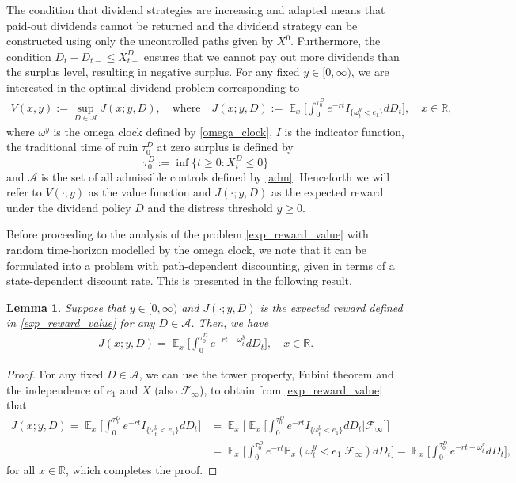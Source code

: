 \documentclass[11pt]{article} %
\newtheorem{lemma}[theorem]{Lemma}
\def\R{\mathbb{R}}
\def\Pr{\mathbb{P}}
\DeclareMathOperator{\E}{\mathbb E}
\numberwithin{komcounter}{section}
\numberwithin{equation}{section}
\numberwithin{theorem}{section}
\begin{document}
The condition that dividend strategies are increasing and adapted means that paid-out dividends cannot be returned and the dividend strategy can be constructed using only the uncontrolled paths given by $X^0$. 
Furthermore, the condition $D_{t}-D_{t-} \leq X_{t-}^D$ ensures that we cannot pay out more dividends than the surplus level, resulting in negative surplus.
For any fixed $y \in [0,\infty)$, we are interested in the optimal dividend problem corresponding to 
\begin{align}\label{exp_reward_value}
V(x,y) := \sup_{D\in\mathcal{A}} J(x;y,D), 
\quad \text{where} \quad 
J(x;y,D) := \E_x\bigg[\int_0^{\tau^D_0}e^{-rt}I_{\{\omega^y_t<e_1\}}dD_t\bigg], 
\quad x \in \R,
\end{align}
where $\omega^y$ is the omega clock defined by \eqref{omega_clock}, $I$ is the indicator function, the traditional time of ruin $\tau^D_0$ at zero surplus is defined by 
$$
\tau^D_0 := \inf\big\{t\geq 0 : X^D_t\leq 0 \big\}
$$ 
and $\mathcal{A}$ is the set of all admissible controls defined by \eqref{adm}.
Henceforth we will refer to $V(\cdot;y)$ as the value function and $J(\cdot;y,D)$ as the expected reward under the dividend policy $D$ and the distress threshold $y \geq 0$. 

Before proceeding to the analysis of the problem \eqref{exp_reward_value} with random time-horizon modelled by the omega clock, we note that it can be formulated into a problem with path-dependent discounting, given in terms of a state-dependent discount rate. 
This is presented in the following result. 

\begin{lemma}
\label{discount_chance_lemma}
Suppose that $y \in [0,\infty)$ and $J(\cdot;y,D)$ is the expected reward defined in \eqref{exp_reward_value} for any $D \in \mathcal{A}$. 
Then, we have 
\begin{align}
\label{expected_reward_discount}
J(x;y,D)=\E_x\bigg[\int_0^{\tau^D_0}e^{-rt-\omega^y_t}dD_t\bigg], 
\quad x \in \R.
\end{align}
\end{lemma}

\begin{proof}
For any fixed $D \in \mathcal{A}$, we can use the tower property, Fubini theorem and the independence of $e_1$ and $X$ (also $\mathcal{F}_{\infty}$), to obtain from \eqref{exp_reward_value} that
\begin{align*}
J(x;y,D) 
= \E_x\bigg[ \int_0^{\tau^D_0}e^{-rt}I_{\{\omega^y_t<e_1\}}dD_t \bigg] 
&= \E_x\bigg[ \E_x\bigg[ \int_0^{\tau^D_0} e^{-rt} I_{\{\omega^y_t<e_1\}} dD_t \bigg| \mathcal{F}_{\infty} \bigg] \bigg] \\
&= \E_x\bigg[ \int_0^{\tau^D_0} e^{-rt} \Pr_x \left( \omega^y_t<e_1 | \mathcal{F}_{\infty} \right) dD_t \bigg] 
= \E_x\bigg[ \int_0^{\tau^D_0} e^{-rt-\omega^y_t} dD_t \bigg],
\end{align*}
for all $x \in \R$, which completes the proof.  
\end{proof}
\end{document}
